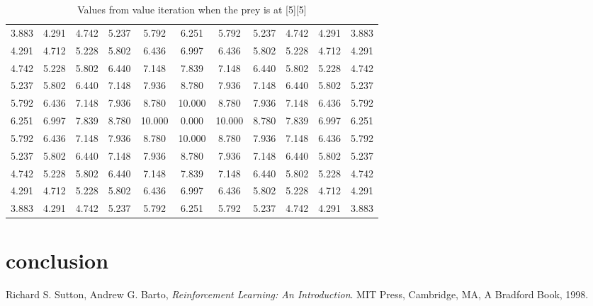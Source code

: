 \documentclass[paper=a4, fontsize=11pt]{scrartcl}
\numberwithin{equation}{section}		%
\numberwithin{figure}{section}			%
\numberwithin{table}{section}				%
\begin{document}
\begin{table}[H]
\caption{Values from value iteration when the prey is at [5][5]}
\centering
\begin{tabular}{l*{9}{c}r}
  \hline
3.883 & 4.291 & 4.742 & 5.237 & 5.792 & 6.251 & 5.792 & 5.237 & 4.742 & 4.291 & 3.883 \\
4.291 & 4.712 & 5.228 & 5.802 & 6.436 & 6.997 & 6.436 & 5.802 & 5.228 & 4.712 & 4.291 \\
4.742 & 5.228 & 5.802 & 6.440 & 7.148 & 7.839 & 7.148 & 6.440 & 5.802 & 5.228 & 4.742 \\
5.237 & 5.802 & 6.440 & 7.148 & 7.936 & 8.780 & 7.936 & 7.148 & 6.440 & 5.802 & 5.237 \\
5.792 & 6.436 & 7.148 & 7.936 & 8.780 & 10.000 & 8.780 & 7.936 & 7.148 & 6.436 & 5.792 \\
6.251 & 6.997 & 7.839 & 8.780 & 10.000 & 0.000 & 10.000 & 8.780 & 7.839 & 6.997 & 6.251 \\
5.792 & 6.436 & 7.148 & 7.936 & 8.780 & 10.000 & 8.780 & 7.936 & 7.148 & 6.436 & 5.792 \\
5.237 & 5.802 & 6.440 & 7.148 & 7.936 & 8.780 & 7.936 & 7.148 & 6.440 & 5.802 & 5.237 \\
4.742 & 5.228 & 5.802 & 6.440 & 7.148 & 7.839 & 7.148 & 6.440 & 5.802 & 5.228 & 4.742 \\
4.291 & 4.712 & 5.228 & 5.802 & 6.436 & 6.997 & 6.436 & 5.802 & 5.228 & 4.712 & 4.291 \\
3.883 & 4.291 & 4.742 & 5.237 & 5.792 & 6.251 & 5.792 & 5.237 & 4.742 & 4.291 & 3.883
\end{tabular}
\label{vitS}
\end{table}

\section{conclusion}
\label{discussion}

\begin{thebibliography}{9}

  Richard S. Sutton, Andrew G. Barto,
  \emph{Reinforcement Learning: An Introduction}.
  MIT Press, Cambridge, MA, 
  A Bradford Book,
  1998.

\end{thebibliography}

\end{document}
